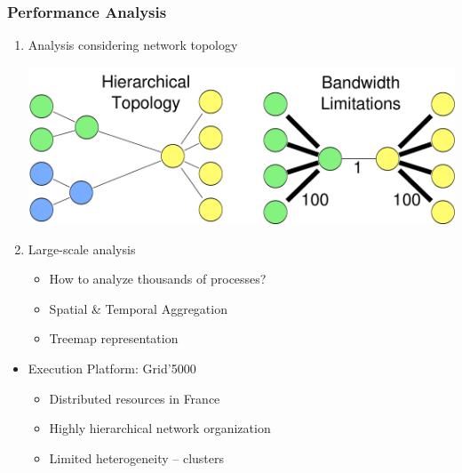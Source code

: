 \frame
{
   \frametitle{Performance Analysis}

   \begin{enumerate}
   \item Analysis considering network topology

      \begin{minipage}{\textwidth}
      \centering
      \includegraphics[width=.8\textwidth]{img/analysis-net.pdf}
      \end{minipage}

\vfill

   \item Large-scale analysis
	\begin{itemize}
	\item How to analyze thousands of processes?
	\item Spatial \& Temporal Aggregation
	\item Treemap representation
	\end{itemize}
   \end{enumerate}

   \begin{itemize}
   \item Execution Platform: Grid'5000
      \begin{itemize}
      \item Distributed resources in France
      \item Highly hierarchical network organization
      \item Limited heterogeneity -- clusters
      \end{itemize}
   \end{itemize}
}






